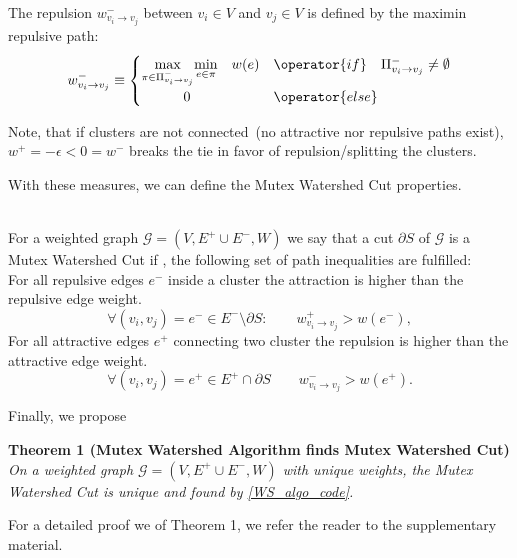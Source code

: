 \begin{definition}[Repulsion] The repulsion $w_{v_{i}\rightarrow v_{j}}^{-}$ between $v_i\in V$ and $v_j \in V$ is defined by the maximin repulsive path:
\begin{equation}
w_{v_{i}\rightarrow v_{j}}^{-}\equiv\begin{cases}
\underset{\pi \in \Pi_{v_{i}\rightarrow v_{j}}^{-}}{\max} \underset{e \in \pi}{\min} \quad w(e) & \operator{if}\quad\Pi_{v_{i}\rightarrow v_{j}}^{-}\neq\emptyset\\
\quad\quad\quad 0 & \operator{else}
\end{cases}\label{eq:maximin_weight_b}
\end{equation}
\end{definition}
\noindent Note, that if clusters are not connected~(no attractive nor repulsive paths exist), $w^+=-\epsilon < 0 = w^-$ breaks the tie in favor of repulsion/splitting the clusters.

\noindent With these measures, we can define the Mutex Watershed Cut properties.

\begin{definition}  \label{def:path_ineq}\\
For a weighted graph ${\mathcal{G}=(V,E^{+}\cup E^{-}, W)}$ we say that a cut $\partial S$ of $\mathcal{G}$ is a Mutex Watershed Cut if , %
 the following set of path inequalities are fulfilled: \\
 For all repulsive edges $e^-$ inside a cluster the attraction is higher than the repulsive edge weight.
\begin{equation}
\forall(v_{i},v_{j})=e^{-}\in E^{-}\setminus \partial S: \quad \quad w_{v_{i}\rightarrow v_{j}}^{+} > w(e^{-}),\label{eq:path_rel_1}
\end{equation}
 For all attractive edges $e^+$ connecting two cluster the repulsion %
 is higher than the attractive edge weight.
\begin{equation}
\forall(v_{i},v_{j})=e^{+}\in E^{+}\cap \partial S \quad \quad w_{v_{i}\rightarrow v_{j}}^{-}>w(e^{+}).\label{eq:path_rel_2}
\end{equation}
\end{definition}


\noindent Finally, we propose

\noindent \textbf{Theorem 1 (Mutex Watershed Algorithm finds Mutex Watershed Cut)}
\emph{On a weighted graph ${\mathcal{G}=(V,E^{+}\cup E^{-}, W)}$ with unique weights, the Mutex Watershed Cut is unique and found by \autoref{WS_algo_code}.}

For a detailed proof we of Theorem 1, we refer the reader to the supplementary material.

